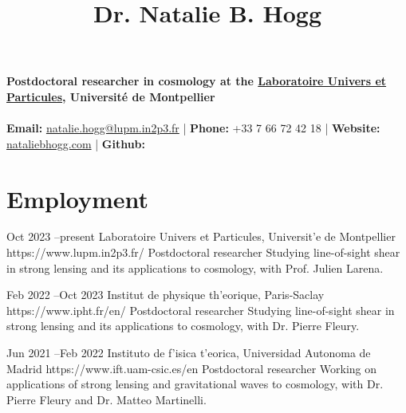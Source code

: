\documentclass[11pt]{article}
\begin{document}
\title{Dr. Natalie B. Hogg} %

\textbf{Postdoctoral researcher in cosmology at the \href{https://www.lupm.in2p3.fr/}{Laboratoire Univers et Particules}, Universit\'e de Montpellier}\\ \\
\textbf{Email:} \href{mailto:natalie.hogg@lupm.in2p3.fr}{natalie.hogg@lupm.in2p3.fr} | \textbf{Phone:} +33 7 66 72 42 18 | \textbf{Website:} \href{nataliebhogg.com}{nataliebhogg.com} | \textbf{Github:} \href{https://github.com/nataliehogg}{\faGithub}

%
%
%



\section{Employment}

\job
{Oct 2023 --}{present}
{Laboratoire Univers et Particules, Universit\a'{e} de Montpellier}
{https://www.lupm.in2p3.fr/}
{Postdoctoral researcher}
{Studying line-of-sight shear in strong lensing and its applications to cosmology, with Prof. Julien Larena.}

\job
{Feb 2022 --}{Oct 2023}
{Institut de physique th\a'{e}orique, Paris-Saclay}
{https://www.ipht.fr/en/}
{Postdoctoral researcher}
{Studying line-of-sight shear in strong lensing and its applications to cosmology, with Dr. Pierre Fleury.}

\job
{Jun 2021 --}{Feb 2022}
{Instituto de f\a'{i}sica t\a'{e}orica, Universidad Autonoma de Madrid}
{https://www.ift.uam-csic.es/en}
{Postdoctoral researcher}
{Working on applications of strong lensing and gravitational waves to cosmology, with Dr. Pierre Fleury and Dr. Matteo Martinelli.}
\end{document}
